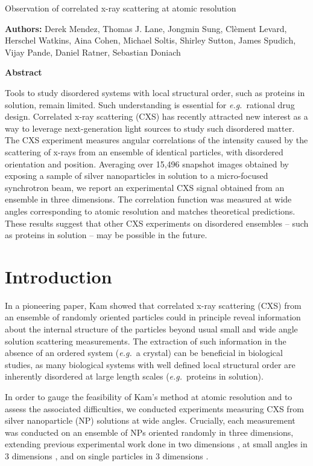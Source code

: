 \documentclass [11pt,fleqn]{article}
\def \hfb {\hfill\break}
\begin{document}
 
\hspace{1cm}{\bf Title:} Observation of correlated x-ray scattering at atomic resolution \hfb
 
{\bf Authors:} Derek Mendez, Thomas J. Lane, Jongmin Sung,  Cl\`ement Levard, Herschel Watkins, Aina Cohen, Michael Soltis, Shirley Sutton, James Spudich, Vijay Pande,  Daniel Ratner, Sebastian Doniach

{\bf Abstract}

Tools to study disordered systems with local structural order, such as proteins in solution, remain limited. Such understanding is essential for \emph{e.g.}~rational drug design. Correlated x-ray scattering (CXS) has recently attracted new interest as a way to leverage next-generation light sources to study such disordered matter. The CXS experiment measures angular correlations of the intensity caused by the scattering of x-rays from an ensemble of identical particles, with disordered orientation and position. Averaging over 15,496 snapshot images obtained by exposing a sample of silver nanoparticles in solution to a micro-focused synchrotron beam, we report an experimental CXS signal obtained from an ensemble in three dimensions. The correlation function was measured at  wide angles corresponding to atomic resolution and matches theoretical predictions. These results suggest that other CXS experiments on disordered ensembles -- such as proteins in solution -- may be possible in the future.


\section{Introduction}

In a pioneering paper, Kam \cite{Kam:1977wc} showed that correlated x-ray scattering (CXS) from an ensemble of randomly oriented particles could in principle reveal information about the internal structure of the particles beyond usual small and wide angle solution scattering measurements. The extraction of such information in the absence of an ordered system (\textit{e.g.}~a crystal) can be beneficial in biological studies, as many biological systems with well defined local structural order are inherently disordered at large length scales (\textit{e.g.}~proteins in solution).

In order to gauge the feasibility of Kam's method at atomic resolution and to assess the associated difficulties, we conducted experiments measuring CXS from silver nanoparticle (NP) solutions at wide angles. Crucially, each measurement was conducted on an ensemble of NPs oriented randomly in three dimensions, extending previous experimental work done in two dimensions \cite{Saldin:2011ch}, at small angles in 3 dimensions \cite{Kam:1981ua, Wochner:2009ia}, and on single particles in 3 dimensions \cite{Kam:1985tz, Starodub:1fy}. 
\end{document}

